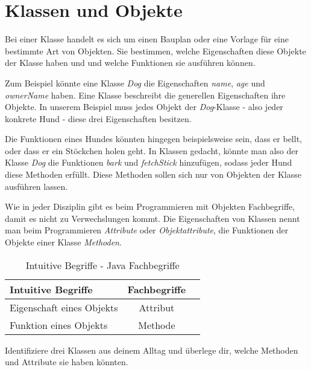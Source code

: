 
\section*{Klassen und Objekte}

Bei einer Klasse handelt es sich um einen Bauplan oder eine Vorlage für eine bestimmte Art von Objekten.
Sie bestimmen, welche Eigenschaften diese Objekte der Klasse haben und und welche Funktionen sie ausführen können.

Zum Beispiel könnte eine Klasse \textit{Dog} die Eigenschaften \textit{name}, \textit{age} und \textit{ownerName} haben.
Eine Klasse beschreibt die generellen Eigenschaften ihre Objekte.
In unserem Beispiel muss jedes Objekt der \textit{Dog}-Klasse - also jeder konkrete Hund - diese drei Eigenschaften besitzen.

Die Funktionen eines Hundes könnten hingegen beispielsweise sein, dass er bellt, oder dass er ein Stöckchen holen geht.
In Klassen gedacht, könnte man also der Klasse \textit{Dog} die Funktionen \textit{bark} und \textit{fetchStick} hinzufügen, sodass jeder Hund diese Methoden erfüllt.
Diese Methoden sollen sich nur von Objekten der Klasse ausführen lassen.

Wie in jeder Disziplin gibt es beim Programmieren mit Objekten Fachbegriffe, damit es nicht zu Verwechslungen kommt.
Die Eigenschaften von Klassen nennt man beim Programmieren \textit{Attribute} oder \textit{Objektattribute}, die Funktionen der Objekte einer Klasse \textit{Methoden}.

\begin{table}
    \caption{Intuitive Begriffe - Java Fachbegriffe}
    \begin{tabular}{l|c|c}
        Intuitive Begriffe & Fachbegriffe\\\hline
        Eigenschaft eines Objekts & Attribut\\
        Funktion eines Objekts & Methode\\
    \end{tabular}
\end{table}


Identifiziere drei Klassen aus deinem Alltag und überlege dir, welche Methoden und Attribute sie haben könnten.

\begin{figure}[H]
    \centering
\end{figure}


